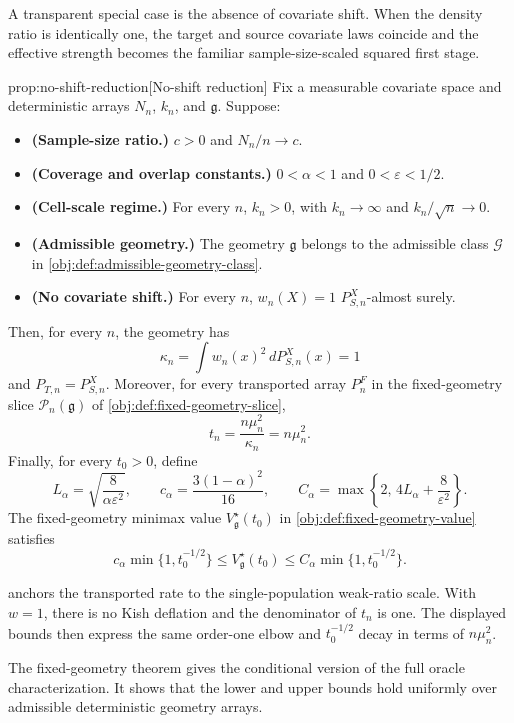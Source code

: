 A transparent special case is the absence of covariate shift. When the density ratio is identically one, the target and source covariate laws coincide and the effective strength becomes the familiar sample-size-scaled squared first stage.

\begin{theoremv}{prop:no-shift-reduction}[No-shift reduction]
Fix a measurable covariate space and deterministic arrays \(N_n\), \(k_n\), and \(\mathfrak g\). Suppose:
\begin{itemize}
\item \textbf{(Sample-size ratio.)} \(c>0\) and \(N_n/n\to c\).
\item \textbf{(Coverage and overlap constants.)} \(0<\alpha<1\) and \(0<\varepsilon<1/2\).
\item \textbf{(Cell-scale regime.)} For every \(n\), \(k_n>0\), with \(k_n\to\infty\) and \(k_n/\sqrt n\to0\).
\item \textbf{(Admissible geometry.)} The geometry \(\mathfrak g\) belongs to the admissible class \(\mathcal G\) in \cref{obj:def:admissible-geometry-class}.
\item \textbf{(No covariate shift.)} For every \(n\), \(w_n(X)=1\) \(P_{S,n}^X\)-almost surely.
\end{itemize}
Then, for every \(n\), the geometry has
\[
\kappa_n=\int w_n(x)^2\,dP_{S,n}^X(x)=1
\]
and \(P_{T,n}=P_{S,n}^X\). Moreover, for every transported array \(P_n^F\) in the fixed-geometry slice \(\mathcal P_n(\mathfrak g)\) of \cref{obj:def:fixed-geometry-slice},
\[
t_n=\frac{n\mu_n^2}{\kappa_n}=n\mu_n^2 .
\]
Finally, for every \(t_0>0\), define
\[
L_\alpha=\sqrt{\frac{8}{\alpha\varepsilon^2}},
\qquad
c_\alpha=\frac{3(1-\alpha)^2}{16},
\qquad
C_\alpha=\max\left\{2,\,4L_\alpha+\frac{8}{\varepsilon^2}\right\}.
\]
The fixed-geometry minimax value \(V_{\mathfrak g}^\star(t_0)\) in \cref{obj:def:fixed-geometry-value} satisfies
\[
c_\alpha\min\{1,t_0^{-1/2}\}
\le
V_{\mathfrak g}^\star(t_0)
\le
C_\alpha\min\{1,t_0^{-1/2}\}.
\]
\end{theoremv}

 anchors the transported rate to the single-population weak-ratio scale. With \(w=1\), there is no Kish deflation and the denominator of \(t_n\) is one. The displayed bounds then express the same order-one elbow and \(t_0^{-1/2}\) decay in terms of \(n\mu_n^2\).

The fixed-geometry theorem gives the conditional version of the full oracle characterization. It shows that the lower and upper bounds hold uniformly over admissible deterministic geometry arrays.

